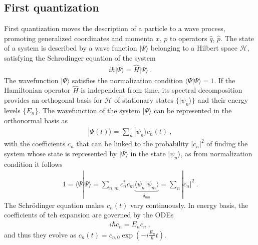 \documentclass[letterpaper,10pt,english]{jupyterBook}
\begin{document}
\subsection{First quantization}
\label{\detokenize{ch/quantum-mechanics/qft/multi-body:first-quantization}}\label{\detokenize{ch/quantum-mechanics/qft/multi-body:quantum-mechanics-qft-multi-body-first-quantization}}
\sphinxAtStartPar
First quantization moves the description of a particle to a wave process, promoting generalized coordinates and momenta \(x\), \(p\) to operators \(\hat{q}\), \(\hat{p}\). The state of a system is described by a wave function \(| \Psi \rangle\) belonging to a Hilbert space \(\mathcal{H}\), satisfying the Schrodinger equation of the system
\begin{equation*}
\begin{split}i \hbar \dot{ | \Psi \rangle } = \hat{H} | \Psi \rangle \ .\end{split}
\end{equation*}
\sphinxAtStartPar
The wavefunction \(| \Psi \rangle\) satisfies the normalization condition \(\langle \Psi | \Psi \rangle = 1\).
If the Hamiltonian operator \(\hat{H}\) is independent from time, its spectral decomposition provides an orthogonal basis for \(\mathcal{H}\) of stationary states \(\{ | \psi_n \rangle \}\) and their energy levels \(\{ E_n \}\). The wavefunction of the system \(| \Psi \rangle\) can be represented in the orthonormal basis as
\begin{equation*}
\begin{split}| \Psi(t) \rangle = \sum_n | \psi_n \rangle c_n(t) \ ,\end{split}
\end{equation*}
\sphinxAtStartPar
with the coefficients \(c_n\) that can be linked to the probability \(|c_n|^2\) of finding the system whose state is represented by \(| \Psi \rangle\) in the state \(| \psi_n \rangle\), as from normalization condition it follows
\begin{equation*}
\begin{split}1 = \langle \Psi | \Psi \rangle = \sum_{n,m} c_n^* c_m \underbrace{\langle \psi_n | \psi_m \rangle}_{\delta_{nm}} = \sum_n |c_n|^2 \ .\end{split}
\end{equation*}
\sphinxAtStartPar
The Schrödinger equation makes \(c_n(t)\) vary continuously. In energy basis, the coefficients of teh expansion are governed by the ODEs
\begin{equation*}
\begin{split}i \hbar \dot{c}_n = E_n c_n \ ,\end{split}
\end{equation*}
\sphinxAtStartPar
and thus they evolve as \(c_n(t) = c_{n,0} \exp\left( - i \frac{E_n}{\hbar} t \right)\).
\end{document}
